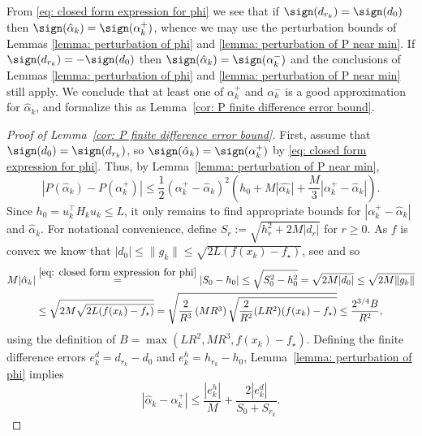 From \eqref{eq: closed form expression for phi} we see that if $\sign(d_{r_k}) = \sign(d_0)$ then $\sign(\hat{\alpha}_k) = \sign(\alpha^{+}_k)$, whence we may use the perturbation bounds of Lemmas \ref{lemma: perturbation of phi} and \ref{lemma: perturbation of P near min}. If $\sign(d_{r_k}) = -\sign(d_0)$ then $\sign(\hat{\alpha}_k) = \sign(\alpha^{-}_k)$ and the conclusions of Lemmas \ref{lemma: perturbation of phi} and \ref{lemma: perturbation of P near min} still apply. We conclude that at least one of $\alpha_k^+$ and $\alpha_k^-$ is a good approximation for $\hat{\alpha}_k$, and formalize this as Lemma~\ref{cor: P finite difference error bound}.
\begin{proof}[Proof of Lemma~\ref{cor: P finite difference error bound}]
    First, assume that $\sign(d_0) = \sign(d_{r_k})$,
    so $\sign(\hat{\alpha}_k) = \sign(\alpha_k^{+})$ by \eqref{eq: closed form expression for phi}. Thus, by Lemma~\ref{lemma: perturbation of P near min},
    \begin{equation}\label{eq: P bound, to be used}
        |P(\hat{\alpha}_k) - P(\alpha_k^+)| \leq
        \frac{1}{2}(\alpha_k^+ - \hat{\alpha}_k)^2\left(h_0 + M |\hat{\alpha_k}| + \frac{M}{3}|\alpha_k^+ - \hat{\alpha}_k|\right).
    \end{equation}
    Since $h_0 = u_k ^{\top} H_k u_k \leq L$, it only remains to find appropriate bounds for $|\alpha_k^+ - \hat{\alpha}_k|$ and $\hat{\alpha}_k$. For notational convenience, define $S_r := \sqrt{h_r^2 + 2M|d_r|}$ for $r\geq 0$. As $f$ is convex we know that $|d_0| \leq \|g_k\| \leq \sqrt{2L(f(x_k)-f_\star)}$, see \cite[Prop. B.3]{bertsekas1997nonlinear} and so
    \begin{align*}
        M|\hat{\alpha}_k|
         & \stackrel{\eqref{eq: closed form expression for phi}} = |S_0 - h_0| \leq \sqrt{S_0^2 - h_0^2}
        = \sqrt{2M|d_0|}
        \leq \sqrt{2M\|g_k\|}                                                                            \\
         & \leq \sqrt{2M\sqrt{2L(f(x_k)-f_\star)}}
        = \sqrt{\frac{2}{R^3}\left(MR^3\right)\sqrt{\frac{2}{R^2}(LR^2)(f(x_k)-f_\star)}}
        \leq \frac{2^{3/4} B}{R^2},
    \end{align*}
    using the definition of $B = \max(LR^2, MR^3, f(x_k)-f_\star)$. Defining the finite difference errors $e_k^d = d_{r_k} - d_{0} $ and $e_k^h = h_{r_k} - h_{0}$,
    Lemma~\ref{lemma: perturbation of phi} implies
    \begin{equation}
        |\hat{\alpha}_k - \alpha_k^+| \leq \frac{|e_k^h|}{M} + \frac{2|e_k^d|}{S_0 + S_{r_k}}.

\end{equation}
\end{proof}
